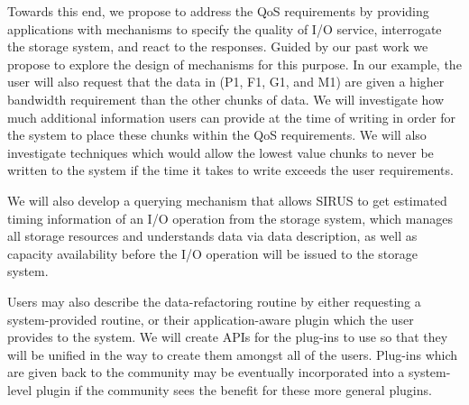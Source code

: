 %

Towards this end, we propose to
address the QoS requirements by providing applications with mechanisms to
specify the quality of I/O service, interrogate the storage system, and react
to the responses. Guided by our past work we propose to explore the design of
mechanisms for this purpose.  In our example, the user will also request that
the data in (P1, F1, G1, and M1) are given a higher bandwidth requirement than
the other chunks of data. We will investigate how much additional information users
can provide at the time of writing in order for the system to place these chunks within
the QoS requirements. We will also investigate techniques which would allow the lowest
value chunks to never be written to the system if the time it takes to write exceeds the user
requirements.



We will also develop a querying mechanism that allows SIRUS
to get estimated timing information of an I/O operation from the storage system, which
manages all storage resources and understands data via data description, as well
as capacity availability before the I/O operation will
be issued to the storage system. 


Users may also describe the data-refactoring routine by either requesting a system-provided
routine, or their application-aware plugin which the user provides to the system. We will
create APIs for the plug-ins to use so that they will be unified in the way to create them
amongst all of the users. Plug-ins which are given back to the community may be 
eventually incorporated into a system-level plugin if the community sees the benefit for
these more general plugins.

